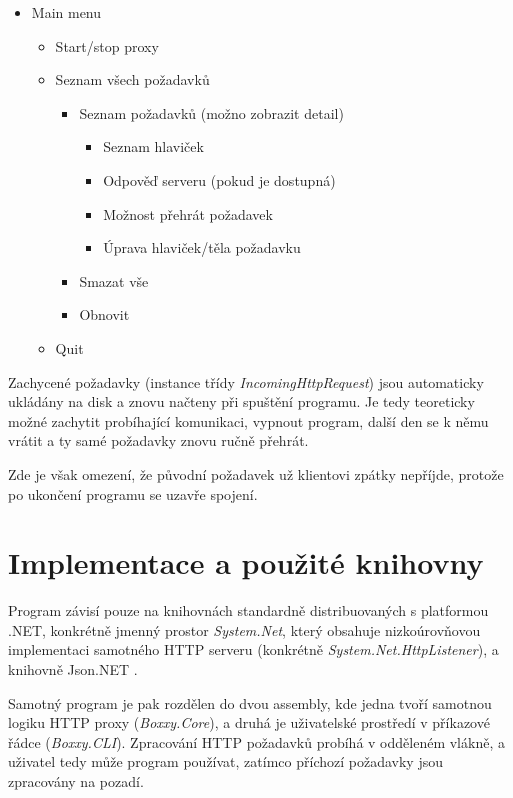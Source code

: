 \documentclass{article}
\begin{document}
\begin{itemize}
	\item Main menu
	\begin{itemize}
		\item Start/stop proxy
		\item Seznam všech požadavků
		\begin{itemize}
			\item Seznam požadavků (možno zobrazit detail)
			\begin{itemize}
				\item Seznam hlaviček
				\item Odpověď serveru (pokud je dostupná)
				\item Možnost přehrát požadavek
				\item Úprava hlaviček/těla požadavku
			\end{itemize}
			\item Smazat vše
			\item Obnovit
		\end{itemize}
		\item Quit
	\end{itemize}
\end{itemize}

Zachycené požadavky (instance třídy \emph{IncomingHttpRequest}) jsou automaticky ukládány na disk a znovu načteny při spuštění programu. Je tedy teoreticky možné zachytit probíhající komunikaci, vypnout program, další den se k němu vrátit a ty samé požadavky znovu ručně přehrát.

Zde je však omezení, že původní požadavek už klientovi zpátky nepříjde, protože po ukončení programu se uzavře spojení.

\section{Implementace a použité knihovny}

Program závisí pouze na knihovnách standardně distribuovaných s platformou .NET, konkrétně jmenný prostor \emph{System.Net}, který obsahuje nizkoúrovňovou implementaci samotného HTTP serveru (konkrétně \emph{System.Net.HttpListener}), a knihovně Json.NET \cite{newtonsoft}.

Samotný program je pak rozdělen do dvou assembly, kde jedna tvoří samotnou logiku HTTP proxy (\emph{Boxxy.Core}), a druhá je uživatelské prostředí v příkazové řádce (\emph{Boxxy.CLI}). Zpracování HTTP požadavků probíhá v odděleném vlákně, a uživatel tedy může program používat, zatímco příchozí požadavky jsou zpracovány na pozadí.
\end{document}
